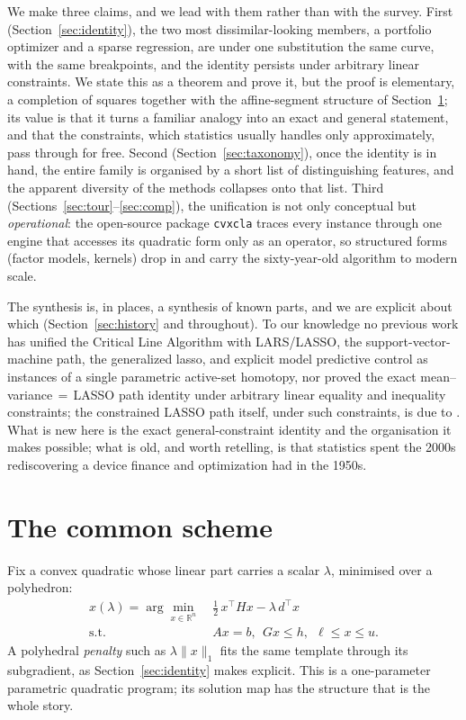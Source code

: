\documentclass[sts]{imsart}
\newcommand{\R}{\mathbb{R}}
\newcommand{\trans}{^{\top}}
\newcommand{\lb}{\ell}
\newcommand{\ub}{u}
\theoremstyle{plain}
\theoremstyle{definition}
\begin{document}
We make three claims, and we lead with them rather than with the survey. First
(Section~\ref{sec:identity}), the two most dissimilar-looking members, a portfolio
optimizer and a sparse regression, are under one substitution the same curve, with the
same breakpoints, and the identity persists under arbitrary linear
constraints. We state this as a theorem and prove it, but the proof is elementary, a
completion of squares together with the affine-segment structure of
Section~\ref{sec:scheme}; its value is that it turns a familiar analogy into an exact
and general statement, and that the constraints, which statistics usually handles only
approximately, pass through for free. Second
(Section~\ref{sec:taxonomy}), once the identity is in hand, the entire family is
organised by a short list of distinguishing features, and the apparent diversity of
the methods collapses onto that list. Third (Sections~\ref{sec:tour}--\ref{sec:comp}),
the unification is not only conceptual but \emph{operational}: the open-source package
\texttt{cvxcla} traces every instance through one engine that accesses its quadratic
form only as an operator, so structured forms (factor models, kernels) drop in and
carry the sixty-year-old algorithm to modern scale.

The synthesis is, in places, a synthesis of known parts, and we are explicit about
which (Section~\ref{sec:history} and throughout). To our knowledge no previous work has
unified the Critical Line Algorithm with LARS/LASSO, the support-vector-machine path,
the generalized lasso, and explicit model predictive control as instances of a single
parametric active-set homotopy, nor proved the exact mean--variance$\,=\,$LASSO path
identity under arbitrary linear equality and inequality constraints; the constrained
LASSO path itself, under such constraints, is due to \citet{gaines2018}. What is new
here is the exact general-constraint identity and the organisation it makes possible;
what is old, and worth retelling, is that statistics spent the 2000s rediscovering a
device finance and optimization had in the 1950s.

\section{The common scheme}
\label{sec:scheme}

Fix a convex quadratic whose linear part carries a scalar $\lambda$,
minimised over a polyhedron:
\begin{equation}
\label{eq:pqp}
\begin{aligned}
x(\lambda) = \arg\min_{x \in \R^n}\ &\tfrac12\, x\trans H x - \lambda\, d\trans x \\
\text{s.t.}\quad &A x = b,\ \ G x \le h,\ \ \lb \le x \le \ub .
\end{aligned}
\end{equation}
A polyhedral \emph{penalty} such as $\lambda\|x\|_1$ fits the same template through its
subgradient, as Section~\ref{sec:identity} makes explicit. This is a one-parameter
parametric quadratic program; its solution map has the structure that is the whole
story.
\end{document}
